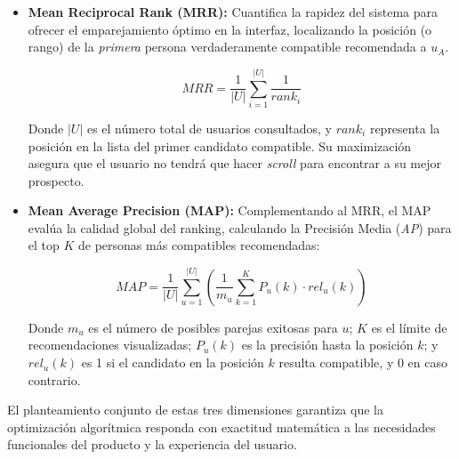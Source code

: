\begin{itemize}
    \item \textbf{Mean Reciprocal Rank (MRR):} Cuantifica la rapidez del sistema para ofrecer el emparejamiento óptimo en la interfaz, localizando la posición (o rango) de la \textit{primera} persona verdaderamente compatible recomendada a $u_A$.
    
    \begin{equation}
        MRR = \frac{1}{|U|} \sum_{i=1}^{|U|} \frac{1}{rank_i}
    \end{equation}
    
    Donde $|U|$ es el número total de usuarios consultados, y $rank_i$ representa la posición en la lista del primer candidato compatible. Su maximización asegura que el usuario no tendrá que hacer \textit{scroll} para encontrar a su mejor prospecto.

    \item \textbf{Mean Average Precision (MAP):} Complementando al MRR, el MAP evalúa la calidad global del ranking, calculando la Precisión Media (\textit{AP}) para el top $K$ de personas más compatibles recomendadas:

    \begin{equation}
        MAP = \frac{1}{|U|} \sum_{u=1}^{|U|} \left( \frac{1}{m_u} \sum_{k=1}^{K} P_u(k) \cdot rel_u(k) \right)
    \end{equation}

    Donde $m_u$ es el número de posibles parejas exitosas para $u$; $K$ es el límite de recomendaciones visualizadas; $P_u(k)$ es la precisión hasta la posición $k$; y $rel_u(k)$ es 1 si el candidato en la posición $k$ resulta compatible, y 0 en caso contrario. 
\end{itemize}

El planteamiento conjunto de estas tres dimensiones garantiza que la optimización algorítmica responda con exactitud matemática a las necesidades funcionales del producto y la experiencia del usuario.
